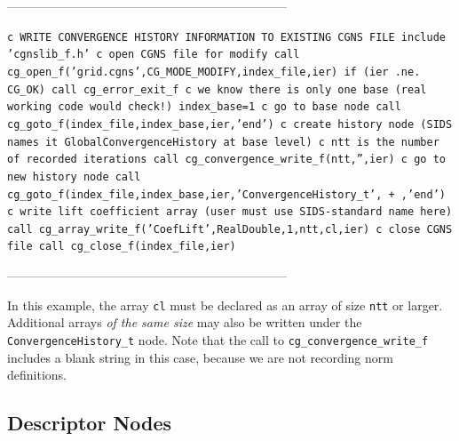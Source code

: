 \documentclass[12pt]{article}
\begin{document}
--------------------------------------------------------------------

{\tt \noindent c  WRITE CONVERGENCE HISTORY INFORMATION TO EXISTING CGNS FILE
\newline\indent      include 'cgnslib\_f.h'
\newline c  open CGNS file for modify
\newline\indent      call cg\_open\_f('grid.cgns',CG\_MODE\_MODIFY,index\_file,ier)
\newline\indent      if (ier .ne. CG\_OK) call cg\_error\_exit\_f
\newline c  we know there is only one base (real working code would check!)
\newline\indent      index\_base=1
\newline c   go to base node
\newline\indent      call cg\_goto\_f(index\_file,index\_base,ier,'end')
\newline c   create history node (SIDS names it GlobalConvergenceHistory at base level)
\newline c   ntt is the number of recorded iterations
\newline\indent      call cg\_convergence\_write\_f(ntt,'',ier)
\newline c   go to new history node
\newline\indent      call cg\_goto\_f(index\_file,index\_base,ier,'ConvergenceHistory\_t',
\newline + ,'end')
\newline c   write lift coefficient array (user must use SIDS-standard name here)
\newline\indent      call cg\_array\_write\_f('CoefLift',RealDouble,1,ntt,cl,ier)
\newline c  close CGNS file
\newline\indent      call cg\_close\_f(index\_file,ier)}

--------------------------------------------------------------------

\noindent In this example, the array {\tt cl} must be declared as 
an array of size {\tt ntt} or larger.  Additional arrays {\it of the same
size} may also be written under the {\tt ConvergenceHistory\_t}
node.  Note that the call to {\tt cg\_convergence\_write\_f}
includes a blank string in this case, because we are not recording
norm definitions.

\subsection{Descriptor Nodes} \label{sec:descript}
\end{document}
